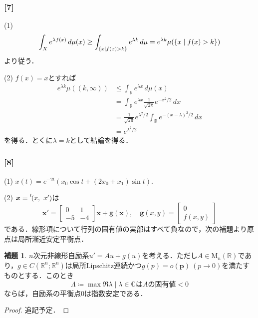 \documentclass[a4j]{ltjsarticle}
\newcommand{\Rset}{\mathbb{R}}
\newcommand{\Cset}{\mathbb{C}}
\newcommand{\1}{\mathbbm{1}}
\newcommand{\transpose}[1]{\prescript{t\!}{}{#1}}
\numberwithin{equation}{section}
\theoremstyle{definition}
\newtheorem{lem}[thm]{補題}
\begin{document}
\subsubsection*{[7]} 
(1) 
\begin{equation}
    \int_{X}e^{\lambda f(x)}\,d\mu(x)\geq \int_{\qty{x\mid f(x)>k}}e^{\lambda k}\,d\mu =e^{\lambda k}\mu(\qty{x\mid f(x)>k})
\end{equation}
より従う．

(2) $f(x)=x$とすれば
\begin{align}
    e^{\lambda k}\mu((k,\infty))&\leq \int_{\Rset}e^{\lambda x}\,d\mu(x)\\
    &=\int_{\Rset}e^{\lambda x}\frac{1}{\sqrt{2\pi}} e^{-x^2/2}\,dx \\
    &=\frac{1}{\sqrt{2\pi}}e^{\lambda^2/2}\int_{\Rset}e^{-(x-\lambda)^2/2}\,dx  \\
    &=e^{\lambda^2/2}
\end{align}
を得る．とくに$\lambda=k$として結論を得る．

\subsubsection*{[8]}
(1) $x(t)=e^{-2t}(x_0\cos t+(2x_0+x_1)\sin t)$.

(2) $\bm{x}=\transpose{(x,\ x')}$は
\begin{equation}
    \bm{x}'=\begin{bmatrix}
        0 & 1 \\
        -5 & -4
    \end{bmatrix}\bm{x}+\bm{g}(\bm{x}),\quad \bm{g}(x,y)=\begin{bmatrix}
        0 \\
        f(x,y)
    \end{bmatrix}
\end{equation}
である．線形項について行列の固有値の実部はすべて負なので，次の補題より原点は局所漸近安定平衡点．
\begin{lem}
    $n$次元非線形自励系$u'=Au+g(u)$を考える．ただし$A\in \mathrm{M}_n(\Rset)$であり，$g\in C(\Rset^n;\Rset^n)$は局所Lipschitz連続かつ$g(p)=o(\bm{p})\ (p\to0)$を満たすものとする．このとき
    \begin{equation}
        \Lambda\coloneq \max{\Re \lambda\mid \text{$\lambda\in\Cset$は$A$の固有値}}<0
    \end{equation}
    ならば，自励系の平衡点$0$は指数安定である．
\end{lem}
\begin{proof}
    {\color{red}追記予定．}
\end{proof}
\end{document}
